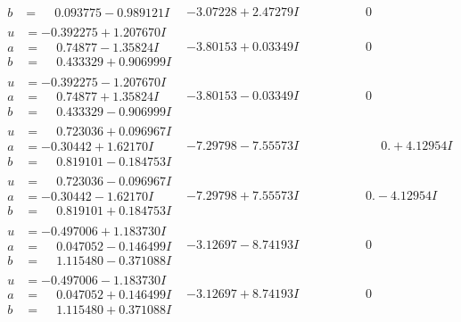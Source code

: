 \documentclass[1p]{elsarticle_modified}
\theoremstyle{definition}
\begin{document}
$$\begin{array}{c|c|c}
\begin{aligned}
b &= \phantom{-}0.093775 - 0.989121 I\end{aligned}
 & -3.07228 + 2.47279 I & \phantom{-0.000000 } 0 \\ \hline\begin{aligned}
u &= -0.392275 + 1.207670 I \\
a &= \phantom{-}0.74877 - 1.35824 I \\
b &= \phantom{-}0.433329 + 0.906999 I\end{aligned}
 & -3.80153 + 0.03349 I & \phantom{-0.000000 } 0 \\ \hline\begin{aligned}
u &= -0.392275 - 1.207670 I \\
a &= \phantom{-}0.74877 + 1.35824 I \\
b &= \phantom{-}0.433329 - 0.906999 I\end{aligned}
 & -3.80153 - 0.03349 I & \phantom{-0.000000 } 0 \\ \hline\begin{aligned}
u &= \phantom{-}0.723036 + 0.096967 I \\
a &= -0.30442 + 1.62170 I \\
b &= \phantom{-}0.819101 - 0.184753 I\end{aligned}
 & -7.29798 - 7.55573 I & \phantom{-0.000000 -}0. + 4.12954 I \\ \hline\begin{aligned}
u &= \phantom{-}0.723036 - 0.096967 I \\
a &= -0.30442 - 1.62170 I \\
b &= \phantom{-}0.819101 + 0.184753 I\end{aligned}
 & -7.29798 + 7.55573 I & \phantom{-0.000000 } 0. - 4.12954 I \\ \hline\begin{aligned}
u &= -0.497006 + 1.183730 I \\
a &= \phantom{-}0.047052 - 0.146499 I \\
b &= \phantom{-}1.115480 - 0.371088 I\end{aligned}
 & -3.12697 - 8.74193 I & \phantom{-0.000000 } 0 \\ \hline\begin{aligned}
u &= -0.497006 - 1.183730 I \\
a &= \phantom{-}0.047052 + 0.146499 I \\
b &= \phantom{-}1.115480 + 0.371088 I\end{aligned}
 & -3.12697 + 8.74193 I & \phantom{-0.000000 } 0 \\ \hline\begin{aligned}

\end{aligned}
\end{array}$$
\end{document}
